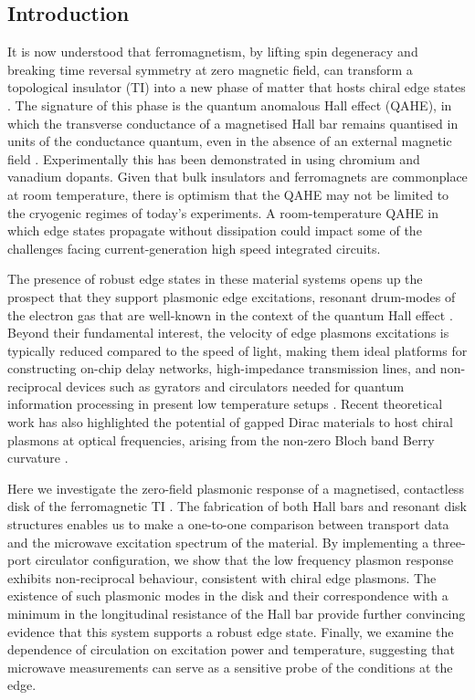 \subsection{Introduction}
It is now understood that ferromagnetism, by lifting spin degeneracy and breaking time reversal symmetry at zero magnetic field, can transform a topological insulator (TI) into a new phase of matter that hosts chiral edge states \cite{qi2008topological, liu2008quantum, yu2010quantized, RevModPhys.83.1057, nomura2011surface}. The signature of this phase is the quantum anomalous Hall effect (QAHE), in which the transverse conductance of a magnetised Hall bar remains quantised in units of the conductance quantum, even in the absence of an external magnetic field \cite{PhysRevLett.61.2015, hasan2010colloquium}. Experimentally this has been demonstrated in  using chromium \cite{chang2013experimental, kou2014scale, checkelsky2014trajectory} and vanadium \cite{chang2015high} dopants. Given that bulk insulators and ferromagnets are commonplace at room temperature, there is optimism that the QAHE may not be limited to the cryogenic regimes of today's experiments. A room-temperature QAHE in which edge states propagate without dissipation could impact some of the challenges facing current-generation high speed integrated circuits.

The presence of robust edge states in these material systems opens up the prospect that they support plasmonic edge excitations, resonant drum-modes of the electron gas that are well-known in the context of the quantum Hall effect \cite{1988ZhETF..94..217V, ashoori1992edge,talyanskii1992spectroscopy}. Beyond their fundamental interest, the velocity of edge plasmons excitations is typically reduced compared to the speed of light, making them ideal platforms for constructing on-chip delay networks, high-impedance transmission lines, and non-reciprocal devices such as gyrators and circulators needed for quantum information processing in present low temperature setups \cite{PhysRevX.4.021019, mahoney2016chip, bosco2016self}. Recent theoretical work has also highlighted the potential of gapped Dirac materials to host chiral plasmons at optical frequencies, arising from the non-zero Bloch band Berry curvature \cite{Rudner_PNAS, kumar2016chiral}.

Here we investigate the zero-field plasmonic response of a magnetised, contactless disk of the ferromagnetic TI .  The fabrication of both Hall bars and resonant disk structures enables us to make a one-to-one comparison between transport data and the microwave excitation spectrum of the material. By implementing a three-port circulator configuration, we show that the low frequency plasmon response exhibits non-reciprocal behaviour, consistent with chiral edge plasmons.  The existence of such plasmonic modes in the disk and their correspondence with a minimum in the longitudinal resistance of the Hall bar provide further convincing evidence that this system supports a robust edge state. Finally, we examine the dependence of circulation on excitation power and temperature, suggesting that microwave measurements can serve as a sensitive probe of the conditions at the edge.

